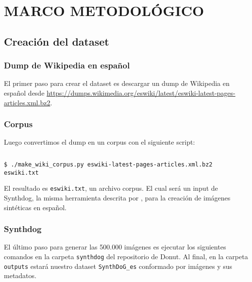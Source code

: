 \documentclass[../main.tex]{subfiles}
\begin{document}
\chapter{MARCO METODOLÓGICO}


\section{Creación del dataset}
\subsection{Dump de Wikipedia en español}

El primer paso para crear el dataset es descargar un dump de Wikipedia en español desde \url{https://dumps.wikimedia.org/eswiki/latest/eswiki-latest-pages-articles.xml.bz2}.

\subsection{Corpus}
Luego convertimos el dump en un corpus con el siguiente script:
\inputminted[bgcolor=codeBack, tabsize=2]{python}{make_wiki_corpus.py}
\begin{verbatim}
$ ./make_wiki_corpus.py eswiki-latest-pages-articles.xml.bz2 eswiki.txt
\end{verbatim}

El resultado es \texttt{eswiki.txt}, un archivo corpus.
El cual será un input de Synthdog, la misma herramienta descrita por \citet{kim2022ocrfree}, para la creación de imágenes sintéticas en español.

\subsection{Synthdog}

El último paso para generar las 500.000 imágenes es ejecutar los siguientes comandos en la carpeta \texttt{synthdog} del repositorio de Donut\cite{kim2022ocrfree}.
Al final, en la carpeta \texttt{outputs} estará nuestro dataset \texttt{SynthDoG\_es}
conformado por imágenes y sus metadatos.
\end{document}

